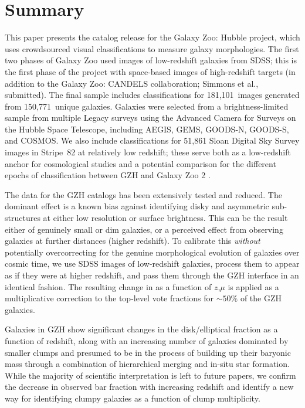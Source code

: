 \documentclass[twocolumn]{aastex6}
\begin{document}
\section{Summary}\label{sec:summary}


This paper presents the catalog release for the Galaxy Zoo: Hubble project, which uses crowdsourced visual classifications to measure galaxy morphologies. The first two phases of Galaxy Zoo \citep{lin11,wil13} used images of low-redshift galaxies from SDSS; this is the first phase of the project with space-based images of high-redshift targets (in addition to the Galaxy Zoo: CANDELS collaboration; Simmons et al., submitted). The final sample includes classifications for 181,101~images generated from 150,771~unique galaxies. Galaxies were selected from a brightness-limited sample from multiple Legacy surveys using the Advanced Camera for Surveys on the Hubble Space Telescope, including AEGIS, GEMS, GOODS-N, GOODS-S, and COSMOS. We also include classifications for 51,861 Sloan Digital Sky Survey images in Stripe~82 at relatively low redshift; these serve both as a low-redshift anchor for cosmological studies and a potential comparison for the different epochs of classification between GZH and Galaxy Zoo 2 \citep{wil13}. 

The data for the GZH catalogs has been extensively tested and reduced. The dominant effect is a known bias against identifying disky and asymmetric sub-structures at either low resolution or surface brightness. This can be the result either of genuinely small or dim galaxies, or a perceived effect from observing galaxies at further distances (higher redshift). To calibrate this \emph{without} potentially overcorrecting for the genuine morphological evolution of galaxies over cosmic time, we use SDSS images of low-redshift galaxies, process them to appear as if they were at higher redshift, and pass them through the GZH interface in an identical fashion. The resulting change in \pfeatures{} as a function of $z$,$\mu$ is applied as a multiplicative correction to the top-level vote fractions for $\sim50\%$ of the GZH galaxies. 

Galaxies in GZH show significant changes in the disk/elliptical fraction as a function of redshift, along with an increasing number of galaxies dominated by smaller clumps and presumed to be in the process of building up their baryonic mass through a combination of hierarchical merging and in-situ star formation. While the majority of scientific interpretation is left to future papers, we confirm the decrease in observed bar fraction with increasing redshift \citep{mel14} and identify a new way for identifying clumpy galaxies as a function of clump multiplicity.
\end{document}
